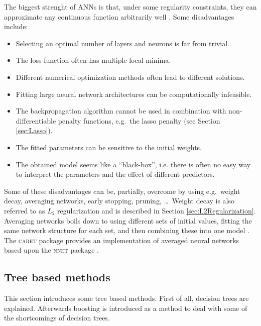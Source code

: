 The biggest strenght of ANNs is that, under some regularity constraints, they can approximate any continuous function arbitrarily well \parencite{hornik_multilayer_1989}. Some disadvantages include:
\begin{itemize}
\item Selecting an optimal number of layers and neurons is far from trivial.
\item The loss-function often has multiple local minima.
\item Different numerical optimization methods often lead to different solutions.
\item Fitting large neural network architectures can be computationally infeasible.
\item The backpropagation algorithm cannot be used in combination with non-differentiable penalty functions, e.g.\ the lasso penalty (see Section \ref{sec:Lasso}).
\item The fitted parameters can be sensitive to the initial weights.
\item The obtained model seems like a ``black-box'', i.e. there is often no easy way to interpret the parameters and the effect of different predictors.
\end{itemize}
Some of these disadvantages can be, partially, overcome by using e.g.\ weight decay, averaging networks, early stopping, pruning, \dots\ Weight decay is also referred to as $L_2$ regularization and is described in Section \ref{sec:L2Regularization}. Averaging networks boils down to using different sets of initial values, fitting the same network structure for each set, and then combining these into one model \parencite{ripley_pattern_2009}. The \textsc{caret} package \parencite{caret} provides an implementation of averaged neural networks based upon the \textsc{nnet} package \parencite{nnet}.


\subsection{Tree based methods}
This section introduces some tree based methods. First of all, decision trees are explained. Afterwards boosting is introduced as a method to deal with some of the shortcomings of decision trees.

